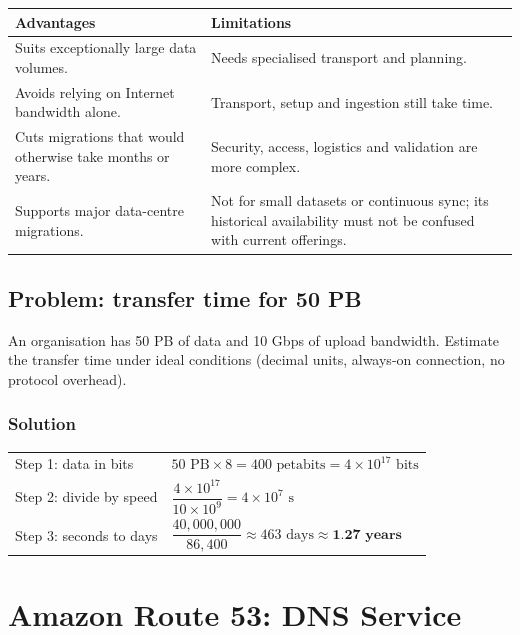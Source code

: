 \documentclass[11pt,a4paper]{article}
\begin{document}
\begin{tabularx}{\textwidth}{@{}XX@{}}
\toprule
\rowcolor{tablehead}\textbf{Advantages} & \textbf{Limitations} \\
\midrule
Suits exceptionally large data volumes. & Needs specialised transport and planning. \\
Avoids relying on Internet bandwidth alone. & Transport, setup and ingestion still take
  time. \\
Cuts migrations that would otherwise take months or years. & Security, access, logistics and
  validation are more complex. \\
Supports major data-centre migrations. & Not for small datasets or continuous sync; its
  historical availability must not be confused with current offerings. \\
\bottomrule
\end{tabularx}


\subsection*{Problem: transfer time for 50 PB}

An organisation has 50 PB of data and 10 Gbps of upload bandwidth. Estimate the transfer time
under ideal conditions (decimal units, always-on connection, no protocol overhead).

\subsubsection*{Solution}

\begin{tabularx}{\textwidth}{@{}lX@{}}
Step 1: data in bits & $50 \text{ PB} \times 8 = 400 \text{ petabits} = 4 \times 10^{17}
  \text{ bits}$ \\
Step 2: divide by speed & $\dfrac{4 \times 10^{17}}{10 \times 10^{9}} = 4 \times 10^{7}
  \text{ s}$ \\[8pt]
Step 3: seconds to days & $\dfrac{40{,}000{,}000}{86{,}400} \approx 463 \text{ days} \approx
  \textbf{1.27 years}$ \\
\end{tabularx}

\section{Amazon Route 53: DNS Service}
\end{document}
